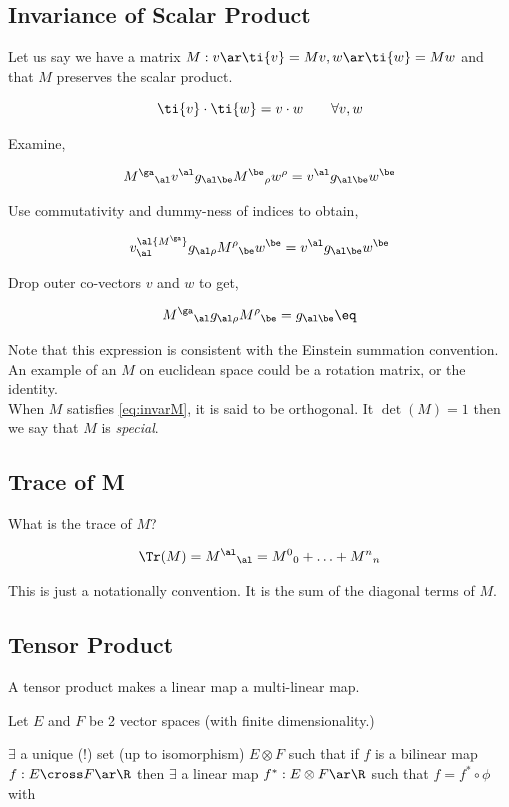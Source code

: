 \documentclass{article}
\begin{document}
\subsection{Invariance of Scalar Product}

Let us say we have a matrix $M : v \ar \ti{v} = Mv, w \ar \ti{w} = Mw$ and that $M$ preserves the scalar product.

\[ \ti{v} \cdot \ti{w} = v \cdot w \qquad \forall v, w \]

Examine,

\[ {M^\ga}_\al v^\al g_{\al\be} {M^\be}_\rho w^\rho = v^\al g_{\al\be}w^\be \]

Use commutativity and dummy-ness of indices to obtain,

\[ v^\al {M^\ga}_\al g_{\al\rho} {M^\rho}_\be w^\be = v^\al g_{\al\be}w^\be \]

Drop outer co-vectors $v$ and $w$ to get,

\[ {M^\ga}_\al g_{\al\rho} {M^\rho}_\be = g_{\al\be} \eq \label{eq:invarM} \]

Note that this expression is consistent with the Einstein summation convention. \\

An example of an $M$ on euclidean space could be a rotation matrix, or the identity. \\

When $M$ satisfies \ref{eq:invarM}, it is said to be orthogonal. It $\det(M) = 1$ then we say that $M$ is \textit{special}.

\subsection{Trace of M}

What is the trace of $M$?

\[ \Tr(M) = {M^\al}_\al = {M^0}_0 + \ldots + {M^n}_n\]

This is just a notationally convention. It is the sum of the diagonal terms of $M$.

\subsection{Tensor Product}

A tensor product makes a linear map a multi-linear map.


Let $E$ and $F$ be 2 vector spaces (with finite dimensionality.)

$\exists $ a unique ($!$) set (up to isomorphism) $E \otimes F$ such that if $f$ is a bilinear map $f: E \cross F \ar \R$ then $\exists$ a linear map $f^* : E \otimes F \ar \R$ such that $f = f^* \circ \phi$ with
\end{document}
